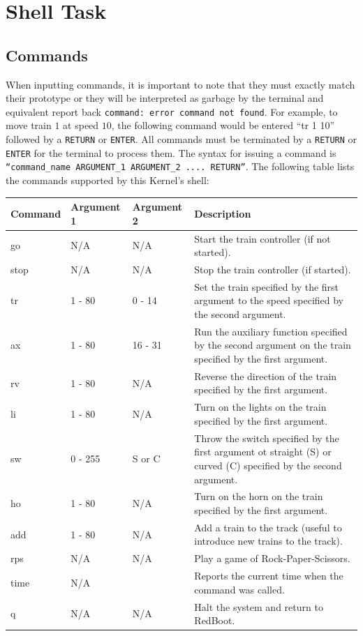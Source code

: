 \documentclass[12pt]{article}
\begin{document}
\section{Shell Task}
\subsection{Commands}
When inputting commands, it is important to note that they must exactly match their prototype or they will be interpreted as garbage by the terminal and equivalent report back \texttt{command: error command not found}.  For example, to move train $1$ at speed $10$, the following command would be entered ``tr 1 10'' followed by a \texttt{RETURN} or \texttt{ENTER}.  All commands must be terminated by a \texttt{RETURN} or \texttt{ENTER} for the terminal to process them.  The syntax for issuing a command is \texttt{``command\_name ARGUMENT\_1 ARGUMENT\_2 .... RETURN''}.  The following table lists the commands supported by this Kernel's shell:
\begin{center}
  \begin{tabular}{|l|l|l|p{}|}
    \hline
    {\bf Command} & {\bf Argument 1} & {\bf Argument 2} & {\bf Description} \\\hline
    go   & N/A     & N/A     & Start the train controller (if not started). \\\hline
    stop & N/A     & N/A     & Stop the train controller (if started). \\\hline
    tr   & 1 - 80  & 0 - 14  & Set the train specified by the first argument to the speed specified by the second argument.\\\hline
    ax   & 1 - 80  & 16 - 31 & Run the auxiliary function specified by the second argument on the train specified by the first argument.\\\hline
    rv   & 1 - 80  & N/A     & Reverse the direction of the train specified by the first argument. \\\hline
    li   & 1 - 80  & N/A     & Turn on the lights on the train specified by the first argument. \\\hline
    sw   & 0 - 255 & S or C  & Throw the switch specified by the first argument ot straight (S) or curved (C) specified by the second argument. \\\hline
    ho   & 1 - 80  & N/A     & Turn on the horn on the train specified by the first argument. \\\hline
    add  & 1 - 80  & N/A     & Add a train to the track (useful to introduce new trains to the track). \\\hline
    rps  & N/A     & N/A     & Play a game of Rock-Paper-Scissors. \\\hline
    time & N/A     &         & Reports the current time when the command was called. \\\hline
    q    & N/A     & N/A     & Halt the system and return to RedBoot. \\\hline
  \end{tabular}
  \\[2\baselineskip]
\end{center}
\end{document}
